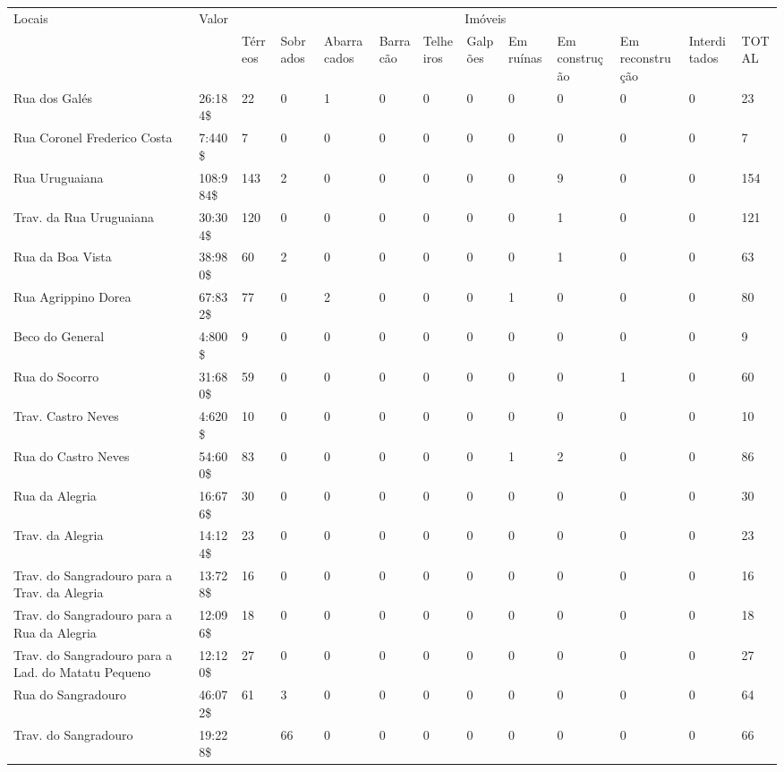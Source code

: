 \begin{sidewaystable}
{
\begin{minipage}{\textwidth}
\begin{tiny}
\begin{tabular}{m{3cm} m{1cm} l l l l l l l l l l l}
\toprule
\multirow{2}{*}{Locais}	& \multirow{2}{*}{Valor}	& \multicolumn{10}{c}{Imóveis}\\
\cline{3-13}
	&	&Térreos	&Sobrados	&Abarracados	&Barracão	&Telheiros	&Galpões	&Em ruínas	&Em construção	&Em reconstrução	&Interditados	&TOTAL\\
\midrule
\midrule
Rua dos Galés							&26:184\$	&22	&0	&1	&0	&0	&0	&0	&0	&0	&0	&23\\
Rua Coronel Frederico Costa					&7:440\$	&7	&0	&0	&0	&0	&0	&0	&0	&0	&0	&7\\
Rua Uruguaiana							&108:984\$	&143	&2	&0	&0	&0	&0	&0	&9	&0	&0	&154\\
Trav. da Rua Uruguaiana					&30:304\$	&120	&0	&0	&0	&0	&0	&0	&1	&0	&0	&121\\
Rua da Boa Vista						&38:980\$	&60	&2	&0	&0	&0	&0	&0	&1	&0	&0	&63\\
Rua Agrippino Dorea						&67:832\$	&77	&0	&2	&0	&0	&0	&1	&0	&0	&0	&80\\
Beco do General							&4:800\$	&9	&0	&0	&0	&0	&0	&0	&0	&0	&0	&9\\
Rua do Socorro							&31:680\$	&59	&0	&0	&0	&0	&0	&0	&0	&1	&0	&60\\
Trav. Castro Neves					&4:620\$	&10	&0	&0	&0	&0	&0	&0	&0	&0	&0	&10\\
Rua do Castro Neves						&54:600\$	&83	&0	&0	&0	&0	&0	&1	&2	&0	&0	&86\\
Rua da Alegria							&16:676\$	&30	&0	&0	&0	&0	&0	&0	&0	&0	&0	&30\\
Trav. da Alegria						&14:124\$	&23	&0	&0	&0	&0	&0	&0	&0	&0	&0	&23\\
Trav. do Sangradouro para a Trav. da Alegria		&13:728\$	&16	&0	&0	&0	&0	&0	&0	&0	&0	&0	&16\\
Trav. do Sangradouro para a Rua da Alegria			&12:096\$	&18	&0	&0	&0	&0	&0	&0	&0	&0	&0	&18\\
Trav. do Sangradouro para a Lad. do Matatu Pequeno	&12:120\$	&27	&0	&0	&0	&0	&0	&0	&0	&0	&0	&27\\
Rua do Sangradouro						&46:072\$	&61	&3	&0	&0	&0	&0	&0	&0	&0	&0	&64\\
Trav. do Sangradouro						&19:228\$	&	&66	&0	&0	&0	&0	&0	&0	&0	&0	&66\\

\end{tabular}
\end{tiny}
\end{minipage}}
\end{sidewaystable}
